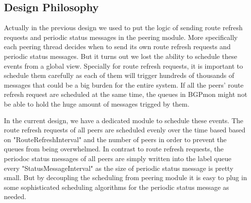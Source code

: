  \subsection{Design Philosophy}
 Actually in the previous design we used to put the logic of sending route refresh requests and periodic status messages in the peering module. 
 More specifically each peering thread decides when to send its own route refresh requests and periodic status messages. 
 But it turns out we lost the ability to schedule these events from a global view. Specially for route refresh requests, it is important to schedule them carefully as each of them will trigger hundreds of thousands of messages that could be a  big burden for the entire system. If all the peers' route refresh request are scheduled at the same time, the queues in BGPmon might not be able to hold the huge amount of messages trigged by them.
 
In the current design, we have a dedicated module to schedule these events. The route refresh requests of all peers are scheduled evenly over the time based based on "RouteRefreshInterval" and the number of peers in order to prevent the queues from being overwhelmed.  In contrast to route refresh requests, the periodoc status messages of all peers are simply written into the label queue every "StatusMessageInterval" as the size of periodic status message is pretty small. But by decoupling the scheduling from peering module it is easy to plug in some sophisticated scheduling algorithms for the periodic status message as needed.
